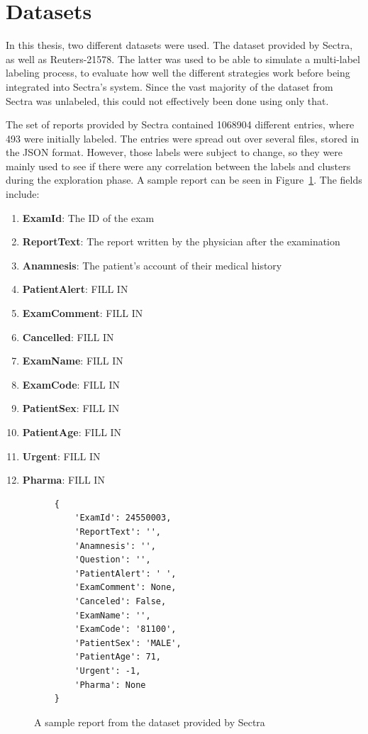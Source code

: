 \section{Datasets}\label{sec:datasets}
In this thesis, two different datasets were used.
The dataset provided by Sectra, as well as Reuters-21578.
The latter was used to be able to simulate a multi-label labeling process, to evaluate how well the different strategies work before being integrated into Sectra's system.
Since the vast majority of the dataset from Sectra was unlabeled, this could not effectively been done using only that.

The set of reports provided by Sectra contained 1068904 different entries, where 493 were initially labeled.
The entries were spread out over several files, stored in the JSON format.
However, those labels were subject to change, so they were mainly used to see if there were any correlation between the labels and clusters during the exploration phase.
A sample report can be seen in Figure~\ref{fig:sample-report}.
The fields include:
\begin{enumerate}
    \item \textbf{ExamId}: The ID of the exam
    \item \textbf{ReportText}: The report written by the physician after the examination
    \item \textbf{Anamnesis}: The patient's account of their medical history
    \item \textbf{PatientAlert}: FILL IN
    \item \textbf{ExamComment}: FILL IN
    \item \textbf{Cancelled}: FILL IN
    \item \textbf{ExamName}: FILL IN
    \item \textbf{ExamCode}: FILL IN
    \item \textbf{PatientSex}: FILL IN
    \item \textbf{PatientAge}: FILL IN
    \item \textbf{Urgent}: FILL IN
    \item \textbf{Pharma}: FILL IN
\end{enumerate}
\begin{figure}
\begin{verbatim}
    {
        'ExamId': 24550003, 
        'ReportText': '',
        'Anamnesis': '',
        'Question': '',
        'PatientAlert': ' ', 
        'ExamComment': None, 
        'Canceled': False, 
        'ExamName': '',
        'ExamCode': '81100', 
        'PatientSex': 'MALE', 
        'PatientAge': 71, 
        'Urgent': -1, 
        'Pharma': None
    }
\end{verbatim}
\caption{A sample report from the dataset provided by Sectra}
\label{fig:sample-report}
\end{figure}

